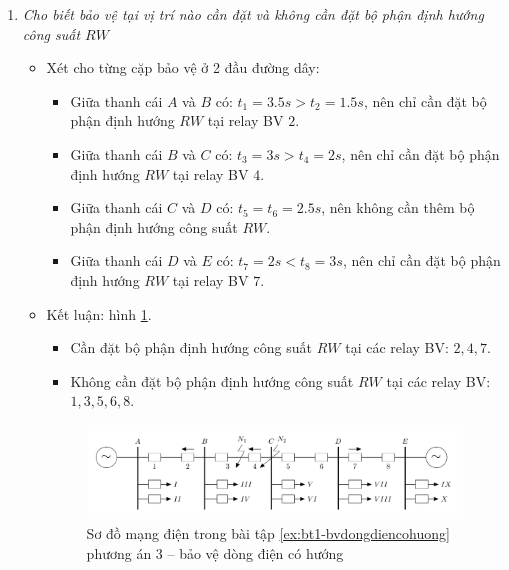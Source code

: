 \documentclass[12pt,a4paper]{article}
\begin{document}
\begin{enumerate}
\begin{enumerate}[\it a.]
					\item \emph{Cho biết bảo vệ tại vị trí nào cần đặt và không cần đặt bộ phận định hướng công suất $RW$}
						\begin{itemize}
							\item Xét cho từng cặp bảo vệ ở 2 đầu đường dây:						
							\begin{itemize}
								\item Giữa thanh cái $A$ và $B$ có: $t_1 = 3.5 \unit{s} > t_2 = 1.5 \unit{s}$, nên chỉ cần đặt bộ phận định hướng $RW$ tại relay BV $2$.
								
								\item Giữa thanh cái $B$ và $C$ có: $t_3 = 3 \unit{s} > t_4 = 2 \unit{s}$, nên chỉ cần đặt bộ phận định hướng $RW$ tại relay BV $4$.
								
								\item Giữa thanh cái $C$ và $D$ có: $t_5 = t_6 = 2.5 \unit{s} $, nên không cần thêm bộ phận định hướng công suất $RW$.
								
								\item Giữa thanh cái $D$ và $E$ có: $t_7 = 2 \unit{s} < t_8 = 3 \unit{s}$, nên chỉ cần đặt bộ phận định hướng $RW$ tại relay BV $7$.
								\end{itemize}
								
							\item Kết luận: hình \ref{Fig:bt1-bvdongdiencohuong-pa3}.
								\begin{itemize}
									\item Cần đặt bộ phận định hướng công suất $RW$ tại các relay BV: $2, 4, 7$.
									
									\item Không cần đặt bộ phận định hướng công suất $RW$ tại các relay BV: $1, 3, 5, 6, 8$.
								\end{itemize}
							
							\begin{figure}[!h]
								\begin{center}
									\includegraphics[scale=1]{diagram-draw-tikz/Figure-baitap-baovedongdiencohuong-bt1-pa3.pdf}
							\end{center}
							\caption{Sơ đồ mạng điện trong bài tập \ref{ex:bt1-bvdongdiencohuong} phương án 3 -- bảo vệ dòng điện có hướng} \label{Fig:bt1-bvdongdiencohuong-pa3}
						\end{figure}
						\end{itemize}
						

\end{enumerate}
\end{enumerate}
\end{document}
